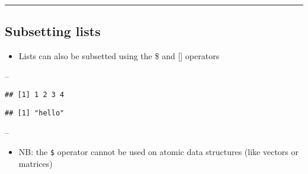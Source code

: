 \documentclass[]{article}
\newenvironment{Shaded}{\begin{snugshade}}{\end{snugshade}}
\newcommand{\DataTypeTok}[1]{\textcolor[rgb]{0.13,0.29,0.53}{#1}}
\newcommand{\DecValTok}[1]{\textcolor[rgb]{0.00,0.00,0.81}{#1}}
\newcommand{\KeywordTok}[1]{\textcolor[rgb]{0.13,0.29,0.53}{\textbf{#1}}}
\newcommand{\NormalTok}[1]{#1}
\newcommand{\OperatorTok}[1]{\textcolor[rgb]{0.81,0.36,0.00}{\textbf{#1}}}
\newcommand{\StringTok}[1]{\textcolor[rgb]{0.31,0.60,0.02}{#1}}
\providecommand{\tightlist}{%
  \setlength{\itemsep}{0pt}\setlength{\parskip}{0pt}}
\begin{document}
\begin{center}\rule{0.5\linewidth}{\linethickness}\end{center}

\hypertarget{subsetting-lists}{%
\subsection{Subsetting lists}\label{subsetting-lists}}

\begin{itemize}
\tightlist
\item
  Lists can also be subsetted using the \$ and {[}{]} operators
\end{itemize}

--

\begin{Shaded}
\end{Shaded}

\begin{verbatim}
## [1] 1 2 3 4
\end{verbatim}

\begin{Shaded}
\end{Shaded}

\begin{verbatim}
## [1] "hello"
\end{verbatim}

--

\begin{itemize}
\tightlist
\item
  NB: the \texttt{\$} operator cannot be used on atomic data structures
  (like vectors or matrices)
\end{itemize}
\end{document}
